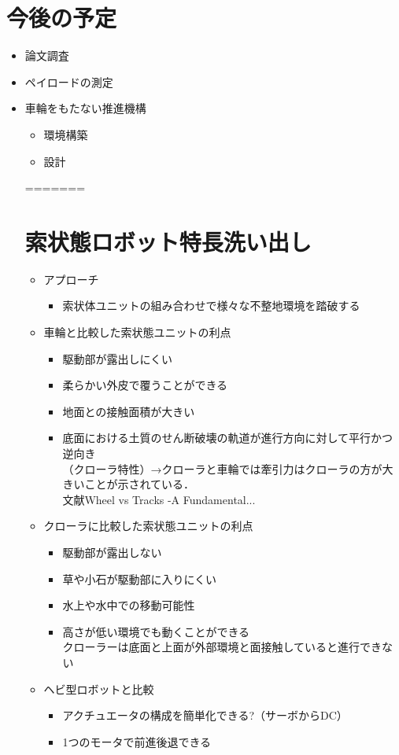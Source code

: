 \section{今後の予定}
	\begin{itemize}
		\item{論文調査}
		\item{ペイロードの測定}
		\item {車輪をもたない推進機構}
		\begin{itemize}
			\item{環境構築}
			\item{設計}
		\end{itemize}
=======
\section*{索状態ロボット特長洗い出し}	
	\begin{itemize}
	\item{アプローチ}
		\begin{itemize}
			\item {索状体ユニットの組み合わせで様々な不整地環境を踏破する}
		\end{itemize}
	\item {車輪と比較した索状態ユニットの利点}
	\begin{itemize}
		\item {駆動部が露出しにくい}
		\item {柔らかい外皮で覆うことができる}
		\item {地面との接触面積が大きい}
		\item {底面における土質のせん断破壊の軌道が進行方向に対して平行かつ逆向き\\
		（クローラ特性）→クローラと車輪では牽引力はクローラの方が大きいことが示されている．\\
		\lbrack 文献\rbrack Wheel vs Tracks -A Fundamental...}
	\end{itemize}
	\item{クローラに比較した索状態ユニットの利点}
	\begin{itemize}
		\item {駆動部が露出しない}
		\item {草や小石が駆動部に入りにくい}
		\item {水上や水中での移動可能性}
		\item {高さが低い環境でも動くことができる\\
		クローラーは底面と上面が外部環境と面接触していると進行できない}
	\end{itemize}
	\item{ヘビ型ロボットと比較}
	\begin{itemize}
		\item {アクチュエータの構成を簡単化できる?（サーボからDC）}
		\item {1つのモータで前進後退できる}
	\end{itemize}
	\end{itemize}
\newpage


\end{itemize}
